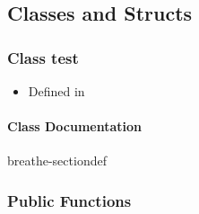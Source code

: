 \documentclass[letterpaper,10pt,english]{sphinxmanual}
\begin{document}
\subsection{Classes and Structs}
\label{\detokenize{api/library_root:classes-and-structs}}
\sphinxstepscope


\subsubsection{Class test}
\label{\detokenize{api/classtest:class-test}}\label{\detokenize{api/classtest:exhale-class-classtest}}\label{\detokenize{api/classtest::doc}}\begin{itemize}
\item {} 
\sphinxAtStartPar
Defined in 

\end{itemize}


\paragraph{Class Documentation}
\label{\detokenize{api/classtest:class-documentation}}

\begin{fulllineitems}
\label{\detokenize{api/classtest:_CPPv44test}}
\pysigstartsignatures
\pysigstartmultiline
{}
\pysigstopmultiline
\pysigstopsignatures
\begin{sphinxuseclass}{breathe-sectiondef}\subsubsection*{Public Functions}

\begin{fulllineitems}
\label{\detokenize{api/classtest:_CPPv4N4test4testEv}}
\pysigstartsignatures
\pysigstartmultiline
{}
\pysigstopmultiline
\pysigstopsignatures
\end{fulllineitems}


\end{sphinxuseclass}
\end{fulllineitems}
\end{document}
